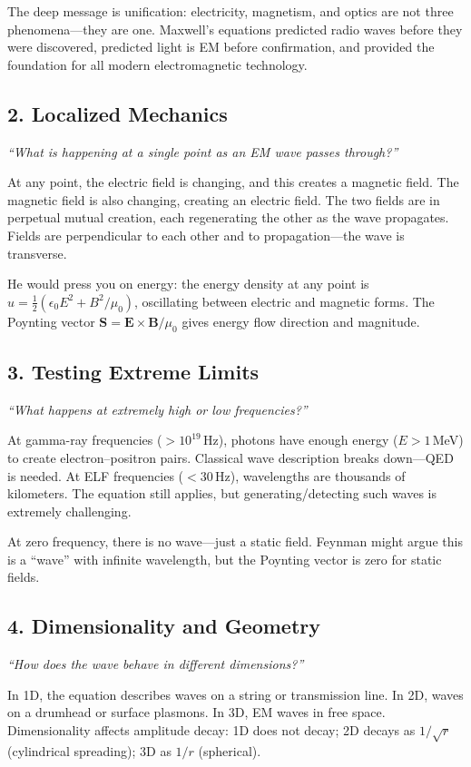 \documentclass[11pt,openright]{book}
\begin{document}
The deep message is unification: electricity, magnetism, and optics are not three phenomena---they are one. Maxwell's equations predicted radio waves before they were discovered, predicted light is EM before confirmation, and provided the foundation for all modern electromagnetic technology.

\subsection*{2. Localized Mechanics}
\textit{``What is happening at a single point as an EM wave passes through?''}

At any point, the electric field is changing, and this creates a magnetic field. The magnetic field is also changing, creating an electric field. The two fields are in perpetual mutual creation, each regenerating the other as the wave propagates. Fields are perpendicular to each other and to propagation---the wave is transverse.

He would press you on energy: the energy density at any point is $u = \frac{1}{2}(\epsilon_0 E^2 + B^2/\mu_0)$, oscillating between electric and magnetic forms. The Poynting vector $\mathbf{S} = \mathbf{E} \times \mathbf{B}/\mu_0$ gives energy flow direction and magnitude.

\subsection*{3. Testing Extreme Limits}
\textit{``What happens at extremely high or low frequencies?''}

At gamma-ray frequencies ($> 10^{19}$\,Hz), photons have enough energy ($E > 1$\,MeV) to create electron--positron pairs. Classical wave description breaks down---QED is needed. At ELF frequencies ($< 30$\,Hz), wavelengths are thousands of kilometers. The equation still applies, but generating/detecting such waves is extremely challenging.

At zero frequency, there is no wave---just a static field. Feynman might argue this is a ``wave'' with infinite wavelength, but the Poynting vector is zero for static fields.

\subsection*{4. Dimensionality and Geometry}
\textit{``How does the wave behave in different dimensions?''}

In 1D, the equation describes waves on a string or transmission line. In 2D, waves on a drumhead or surface plasmons. In 3D, EM waves in free space. Dimensionality affects amplitude decay: 1D does not decay; 2D decays as $1/\sqrt{r}$ (cylindrical spreading); 3D as $1/r$ (spherical).
\end{document}
